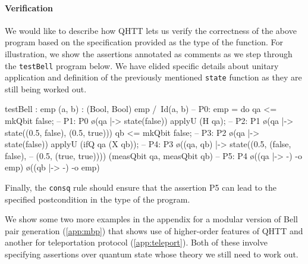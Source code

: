 \documentclass[acmsmall,nonacm,timestamp]{acmart}
\newcommand{\type}[1]{\textrm{\textbf{#1}}}
\begin{document}
\paragraph{Verification}
We would like to describe how QHTT lets us verify the correctness of the above program based on the specification provided as the type of the function. For illustration, we show the assertions annotated as comments as we step through the \texttt{testBell} program below. We have elided specific details about unitary application and definition of the previously mentioned \texttt{state} function as they are still being worked out.

\begin{QCode}
testBell : {emp} (a, b) : (Bool, Bool) {emp /\ Id(a, b)}
              -- P0: emp
         = do qa <= mkQbit false;
              -- P1: P0 \o (qa |-> state(false))
              applyU (H qa);
              -- P2: P1 \o (qa |-> state({(0.5, false), (0.5, true)}))
              qb <= mkQbit false;
              -- P3: P2 \o (qa |-> state(false))
              applyU (ifQ qa (X qb));
              -- P4: P3 \o ((qa, qb) |-> state({(0.5, (false, false),
              --                              (0.5, (true, true))}))
                (measQbit qa, measQbit qb)
              -- P5: P4 \o ((qa |-> -) -o emp) \o ((qb |-> -) -o emp)
\end{QCode}
Finally, the \texttt{consq} rule should ensure that the assertion P5 can lead to the specified postcondition in the type of the program.

We show some two more examples in the appendix for a modular version of Bell pair generation (\cref{app:mbp}) that shows use of higher-order features of QHTT and another for teleportation protocol (\cref{app:teleport}). Both of these involve specifying assertions over quantum state whose theory we still need to work out.



\end{document}
